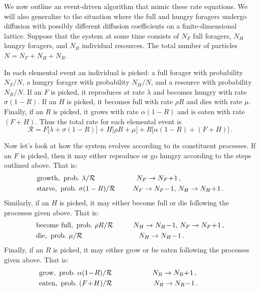 \documentclass[11pt]{iopart}
\begin{document}
We now outline an event-driven algorithm that mimic these rate equations.  We
will also generalize to the situation where the full and hungry foragers
undergo diffusion with possibly different diffusion coefficients on a
finite-dimensional lattice.  Suppose that the system at some time consists of
$N_F$ full foragers, $N_H$ hungry foragers, and $N_R$ individual resources.
The total number of particles $N=N_F+N_H+N_R$.

In each elemental event an individual is picked: a full forager with
probability $N_F/N$, a hungry forager with probability $N_H/N$, and a
resource with probability $N_R/N$.  If an $F$ is picked, it reproduces at
rate $\lambda$ and becomes hungry with rate $\sigma(1-R)$.  If an $H$ is
picked, it becomes full with rate $\rho R$ and dies with rate $\mu$.
Finally, if an $R$ is picked, it grows with rate $\alpha(1-R)$ and is eaten
with rate $(F+H)$.  Thus the total rate for each elemental event is
\begin{equation}
\mathcal{R}=F\big[\lambda +\sigma(1-R)\big]+ H\big[\rho R+\mu\big]+
R\big[\alpha(1-R)+(F+H)\big]\,.
\end{equation}

Now let's look at how the system evolves according to its constituent
processes.  If an $F$ is picked, then it may either reproduce or go hungry
according to the steps outlined above.  That is:
\begin{align*}
&\mathrm{growth,~ prob.\ } \lambda/\mathcal{R}\hskip 0.82 in N_F\to N_F\!+\!1\,,\\
&\mathrm{starve,~ prob.\ } \sigma(1-R)/\mathcal{R} \hskip 0.35 in N_F\to N_F\!-\!1,\,
  N_H\to N_H\!+\!1\,.
\end{align*}
Similarly, if an $H$ is picked, it may either become full or die following the
processes given above.  That is:
\begin{align*}
&\mathrm{become\ full,~  prob.\ } \rho R/\mathcal{R}\hskip 0.4in N_H\to N_H\!-\!1,\,
  N_F\to N_F\!+\!1\,,\\
&\mathrm{die,~ prob.\ } \mu/\mathcal{R}\hskip 1.12 in N_H\to N_H\!-\!1\,.
\end{align*}
Finally, if an $R$ is picked, it may either grow or be eaten following the
processes given above.  That is:
\begin{align*}
&\mathrm{grow,~ prob.\ } \alpha(1\!-\!R)/\mathcal{R}\hskip 0.8in N_R\to N_R\!+\!1\,,\phantom{~~~~~~~~~~}\\
&\mathrm{eaten,~ prob.\ } (F\!+\!H)/\mathcal{R}\hskip 0.82in  N_R\to N_R\!-\!1\,.\phantom{~~~~~~~~~~}
\end{align*}
\end{document}

